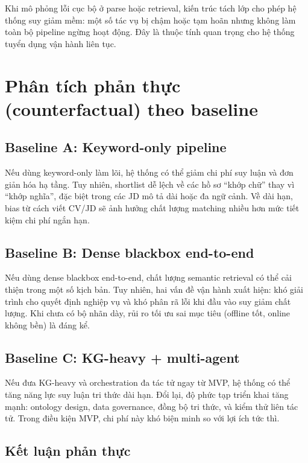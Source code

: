 Khi mô phỏng lỗi cục bộ ở parse hoặc retrieval, kiến trúc tách lớp cho phép hệ thống suy giảm mềm: một số tác vụ bị chậm hoặc tạm hoãn nhưng không làm toàn bộ pipeline ngừng hoạt động. Đây là thuộc tính quan trọng cho hệ thống tuyển dụng vận hành liên tục.

\section{Phân tích phản thực (counterfactual) theo baseline}

\subsection{Baseline A: Keyword-only pipeline}

Nếu dùng keyword-only làm lõi, hệ thống có thể giảm chi phí suy luận và đơn giản hóa hạ tầng. Tuy nhiên, shortlist dễ lệch về các hồ sơ ``khớp chữ'' thay vì ``khớp nghĩa'', đặc biệt trong các JD mô tả dài hoặc đa ngữ cảnh. Về dài hạn, bias từ cách viết CV/JD sẽ ảnh hưởng chất lượng matching nhiều hơn mức tiết kiệm chi phí ngắn hạn.

\subsection{Baseline B: Dense blackbox end-to-end}

Nếu dùng dense blackbox end-to-end, chất lượng semantic retrieval có thể cải thiện trong một số kịch bản. Tuy nhiên, hai vấn đề vận hành xuất hiện: khó giải trình cho quyết định nghiệp vụ và khó phân rã lỗi khi đầu vào suy giảm chất lượng. Khi chưa có bộ nhãn dày, rủi ro tối ưu sai mục tiêu (offline tốt, online không bền) là đáng kể.

\subsection{Baseline C: KG-heavy + multi-agent}

Nếu đưa KG-heavy và orchestration đa tác tử ngay từ MVP, hệ thống có thể tăng năng lực suy luận tri thức dài hạn. Đổi lại, độ phức tạp triển khai tăng mạnh: ontology design, data governance, đồng bộ tri thức, và kiểm thử liên tác tử. Trong điều kiện MVP, chi phí này khó biện minh so với lợi ích tức thì.

\subsection{Kết luận phản thực}


